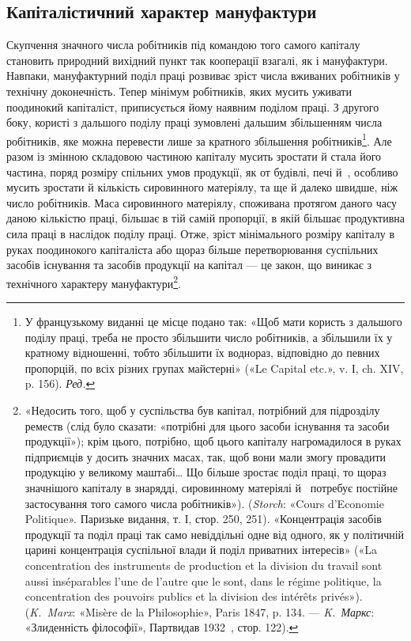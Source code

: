
\subsection{Капіталістичний характер мануфактури}

Скупчення значного числа робітників під командою того
самого капіталу становить природний вихідний пункт так кооперації
взагалі, як і мануфактури. Навпаки, мануфактурний поділ
праці розвиває зріст числа вживаних робітників у технічну
доконечність. Тепер мінімум робітників, яких мусить уживати
поодинокий капіталіст, приписується йому наявним поділом
праці. З другого боку, користі з дальшого поділу праці зумовлені
дальшим збільшенням числа робітників, яке можна перевести
лише за кратного збільшення робітників\footnote*{
У французькому виданні це місце подано так: «Щоб мати користь
з дальшого поділу праці, треба не просто збільшити число робітників, а
збільшили їх у кратному відношенні, тобто збільшити їх воднораз,
відповідно до певних пропорцій, по всіх різних групах майстерні» («Le
Capital etc.», v. І, ch. XIV, p. 156). \emph{Ред.}
}. Але разом із
змінною складовою частиною капіталу мусить зростати й стала
його частина, поряд розміру спільних умов продукції, як от
будівлі, печі й~, особливо мусить зростати й кількість сировинного
матеріялу, та ще й далеко швидше, ніж число робітників.
Маса сировинного матеріялу, споживана протягом даного
часу даною кількістю праці, більшає в тій самій пропорції, в
якій більшає продуктивна сила праці в наслідок поділу праці.
Отже, зріст мінімального розміру капіталу в руках поодинокого
капіталіста або щораз більше перетворювання суспільних засобів
існування та засобів продукції на капітал — це закон, що
виникає з технічного характеру мануфактури\footnote{
«Недосить того, щоб у суспільства був капітал, потрібний для
підрозділу реместв (слід було сказати: «потрібні для цього засоби
існування та засоби продукції»); крім цього, потрібно, щоб цього капіталу
нагромадилося в руках підприємців у досить значних масах, так, щоб
вони мали змогу провадити продукцію у великому маштабі\dots{} Що більше
зростає поділ праці, то щораз значнішого капіталу в знарядді,
сировинному матеріялі й~ потребує постійне застосування того самого числа
робітників»). (\emph{Storch}: «Cours d’Economie Politique». Паризьке видання,
т. І, стор. 250, 251). «Концентрація засобів продукції та поділ
праці так само невіддільні одне від одного, як у політичній царині
концентрація суспільної влади й поділ приватних інтересів» («La
concentration des instruments de production et la division du travail sont aussi
inséparables l’une de l’autre que le sont, dans le régime politique, la
concentration des pouvoirs publics et la division des intérêts privés»).
(\emph{K.~Marx}: «Misère de la Philosophie», Paris 1847, p. 134. — \emph{K.~Маркс}:
«Злиденність філософії», Партвидав 1932~, стор. 122).
}.


